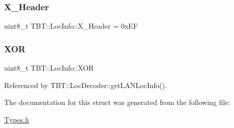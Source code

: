 \mbox{\label{structTBT_1_1LocInfo_a89133f4810d6228a3f918352c03eb922_a89133f4810d6228a3f918352c03eb922}} 
\subsubsection{\texorpdfstring{X\+\_\+\+Header}{X\_Header}}
{\footnotesize\ttfamily uint8\+\_\+t T\+B\+T\+::\+Loc\+Info\+::\+X\+\_\+\+Header = 0x\+EF}

\mbox{\label{structTBT_1_1LocInfo_a291c95e946ab6a1390523590bdeb7722_a291c95e946ab6a1390523590bdeb7722}} 
\subsubsection{\texorpdfstring{X\+OR}{XOR}}
{\footnotesize\ttfamily uint8\+\_\+t T\+B\+T\+::\+Loc\+Info\+::\+X\+OR}



Referenced by T\+B\+T\+::\+Loc\+Decoder\+::get\+L\+A\+N\+Loc\+Info().



The documentation for this struct was generated from the following file\+:\begin{DoxyCompactItemize}
\item 
\hyperlink{Types_8h}{Types.\+h}\end{DoxyCompactItemize}
